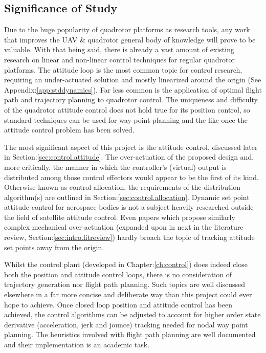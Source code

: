 \subsection{Significance of Study}
\label{subsec:intro.foreword.significance}
Due to the huge popularity of quadrotor platforms as research tools, any work that improves the UAV \& quadrotor general body of knowledge will prove to be valuable. With that being said, there is already a vast amount of existing research on linear and non-linear control techniques for regular quadrotor platforms. The attitude loop is the most common topic for control research, requiring an under-actuated solution and mostly linearized around the origin (See Appendix:\ref{app:stddynamics}). Far less common is the application of optimal flight path and trajectory planning to quadrotor control. The uniqueness and difficulty of the quadrotor attitude control does not hold true for its position control, so standard techniques can be used for way point planning and the like once the attitude control problem has been solved.
\par
The most significant aspect of this project is the attitude control, discussed later in Section:\ref{sec:control.attitude}. The over-actuation of the proposed design and, more critically, the manner in which the controller's (virtual) output is distributed among those control effectors would appear to be the first of its kind. Otherwise known as control allocation, the requirements of the distribution algorithm(s) are outlined in Section:\ref{sec:control.allocation}. Dynamic set point attitude control for aerospace bodies is not a subject heavily researched outside the field of satellite attitude control. Even papers which propose similarly complex mechanical over-actuation (expanded upon in next in the literature review, Section:\ref{sec:intro.litreview}) hardly broach the topic of tracking attitude set points away from the origin.
\par
Whilst the control plant (developed in Chapter:\ref{ch:control}) does indeed close both the position and attitude control loops, there is no consideration of trajectory generation nor flight path planning. Such topics are well discussed elsewhere in a far more concise and deliberate way than this project could ever hope to achieve. Once closed loop position and attitude control has been achieved, the control algorithms can be adjusted to account for higher order state derivative (acceleration, jerk and jounce) tracking needed for nodal way point planning. The heuristics involved with flight path planning are well documented and their implementation is an academic task.
